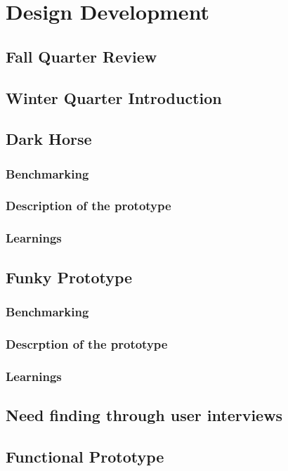 \chapter{Design Development}

\section{Fall Quarter Review}

\section{Winter Quarter Introduction}

\section{Dark Horse}
\subsection{Benchmarking}
\subsection{Description of the prototype}
\subsection{Learnings}
\section{Funky Prototype}
\subsection{Benchmarking}
\subsection{Descrption of the prototype}
\subsection{Learnings}
\section{Need finding through user interviews}
\section{Functional Prototype}
